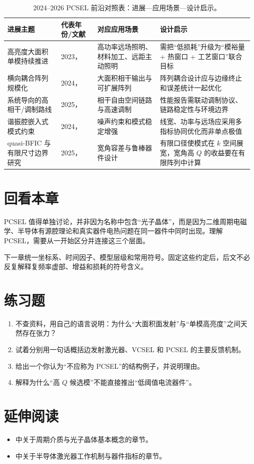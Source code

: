 \begin{table}[htbp]
  \centering
  \footnotesize
  \caption{2024–2026 PCSEL 前沿对照表：进展—应用场景—设计启示。}
  \label{tab:frontier_2024_2026_matrix}
  \setlength{\tabcolsep}{4pt}
  \begin{tabularx}{\textwidth}{@{}p{}p{}p{}Y@{}}
    \toprule
    进展主题 & 代表年份/文献 & 对应应用场景 & 设计启示 \\
    \midrule
    高亮度大面积单模持续推进 & 2023，\cite{yoshida2023} & 高功率远场照明、材料加工、远距主动照明 & 需把“低损耗”升级为“模裕量 + 热窗口 + 工艺窗口”联合目标 \\
    横向耦合阵列规模化 & 2024，\cite{li2024laterallycoupledpcsel} & 大面积相干输出与可扩展阵列 & 阵列耦合设计应与边缘终止和误差统计一起优化 \\
    系统导向的高相干/调制路线 & 2025，\cite{inoue2025fmpcsel} & 相干自由空间链路与高速调制 & 性能报告需联动调制协议、链路稳定性与环境边界 \\
    谐振腔嵌入式模式约束 & 2024，\cite{bian2024resonatorpcsel} & 噪声约束和模式稳定增强 & 线宽、功率与远场应采用多指标协同优化而非单点极值 \\
    quasi-BFIC 与有限尺寸边界研究 & 2025，\cite{qin2025quasibfic,wang2025finitesizepcsel} & 宽角容差与鲁棒器件设计 & 有限口径使模式在 $k$ 空间展宽，宽角高 $Q$ 的收益要在有限阵列中计算 \\
    \bottomrule
  \end{tabularx}
\end{table}

\section*{回看本章}
PCSEL 值得单独讨论，并非因为名称中包含“光子晶体”，而是因为二维周期电磁学、半导体有源腔理论和真实器件电热问题在同一器件中同时出现。理解 PCSEL，需要从一开始区分并连接这三个层面。

下一章统一坐标系、时间因子、模型层级和常用符号。固定这些约定后，后文不必反复解释复频率虚部、增益和损耗的符号含义。

\section*{练习题}
\begin{enumerate}
  \item \basicq 不查资料，用自己的语言说明：为什么“大面积面发射”与“单模高亮度”之间天然存在张力？

  \item \basicq 试着分别用一句话概括边发射激光器、VCSEL 和 PCSEL 的主要反馈机制。

  \item \midq 给出一个你认为“不应称为 PCSEL”的结构例子，并说明理由。

  \item \hardq 解释为什么“高 $Q$ 候选模”不能直接推出“低阈值电流器件”。
\end{enumerate}

\section*{延伸阅读}
\begin{itemize}
  \item \cite{joannopoulos2008} 中关于周期介质与光子晶体基本概念的章节。

  \item \cite{coldren2012} 中关于半导体激光器工作机制与器件指标的章节。
\end{itemize}
